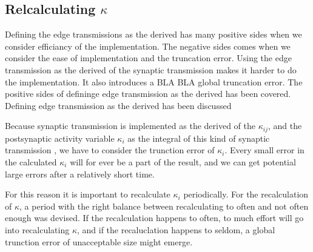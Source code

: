 		\subsection{Relcalculating $\kappa$}
		\label{ssecRecalcKappa}
		Defining the edge transmissions as the derived has many positive sides when we consider efficiancy of the implementation. The negative sides comes when we consider the ease of implementation and the truncation error.
		Using the edge transmission as the derived of the synaptic transmission makes it harder to do the implementation. 
		It also introduces a BLA BLA  global truncation error.
		The positive sides of defininge edge transmission as the derived has been covered. 
		Defining edge transmission as the derived has been discussed 	




		Because synaptic transmission is implemented as the derived of the $\kappa_{ij}$, and the postsynaptic activity variable $\kappa_i$ as the integral of this kind of synaptic transmission
		, we have to consider the trunction error of $\kappa_i$. 
		Every small error in the calculated $\kappa_i$ will for ever be a part of the result, and we can get potential large errors after a relatively short time.

		For this reason it is important to recalculate $\kappa_i$ periodically.
		For the recalculation of $\kappa$, a period with the right balance between recalculating to often and not often enough was devised.
		If the recalculation happens to often, to much effort will go into recalculating $\kappa$, and if the recaluclation happens to seldom, a global trunction error of unacceptable size might emerge.

